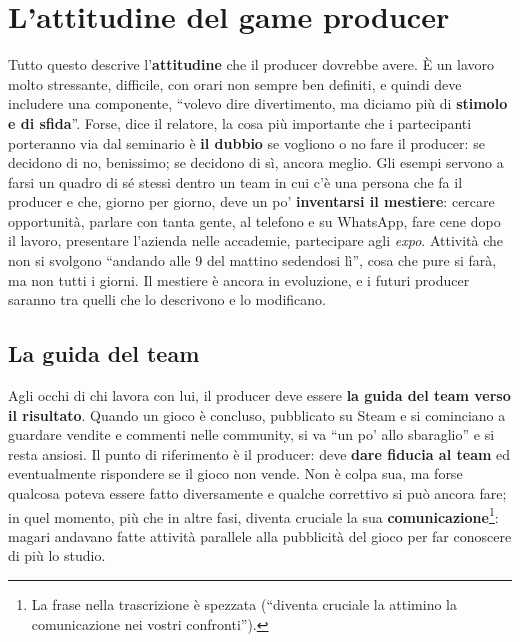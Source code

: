 \section{L'attitudine del game producer}
\label{sec:z5-attitudine}

Tutto questo descrive l'\textbf{attitudine} che il producer dovrebbe avere. È un
lavoro molto stressante, difficile, con orari non sempre ben definiti, e
quindi deve includere una componente, ``volevo dire divertimento, ma diciamo
più di \textbf{stimolo e di sfida}''. Forse, dice il relatore, la cosa più
importante che i partecipanti porteranno via dal seminario è \textbf{il dubbio}
se vogliono o no fare il producer: se decidono di no, benissimo; se decidono di
sì, ancora meglio. Gli esempi servono a farsi un quadro di sé stessi dentro un
team in cui c'è una persona che fa il producer e che, giorno per giorno, deve un
po' \textbf{inventarsi il mestiere}: cercare opportunità, parlare con tanta
gente, al telefono e su WhatsApp, fare cene dopo il lavoro, presentare l'azienda
nelle accademie, partecipare agli \emph{expo}. Attività che non si svolgono
``andando alle 9 del mattino sedendosi lì'', cosa che pure si farà, ma non tutti
i giorni. Il mestiere è ancora in evoluzione, e i futuri producer saranno tra
quelli che lo descrivono e lo modificano.

\subsection{La guida del team}

Agli occhi di chi lavora con lui, il producer deve essere \textbf{la guida del
team verso il risultato}. Quando un gioco è concluso, pubblicato su Steam e si
cominciano a guardare vendite e commenti nelle community, si va ``un po' allo
sbaraglio'' e si resta ansiosi. Il punto di riferimento è il producer: deve
\textbf{dare fiducia al team} ed eventualmente rispondere se il gioco non vende.
Non è colpa sua, ma forse qualcosa poteva essere fatto diversamente e qualche
correttivo si può ancora fare; in quel momento, più che in altre fasi, diventa
cruciale la sua \textbf{comunicazione}\footnote{La frase nella trascrizione è
spezzata (``diventa cruciale la attimino la comunicazione nei vostri
confronti'').}: magari andavano fatte attività parallele alla pubblicità del
gioco per far conoscere di più lo studio.

